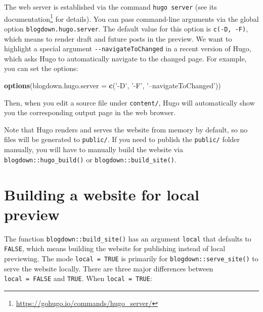 \documentclass[12pt,]{krantz}
\makeatletter
\newenvironment{Shaded}{\begin{snugshade}}{\end{snugshade}}
\newcommand{\KeywordTok}[1]{\textcolor[rgb]{0.13,0.29,0.53}{\textbf{#1}}}
\newcommand{\DataTypeTok}[1]{\textcolor[rgb]{0.13,0.29,0.53}{#1}}
\newcommand{\StringTok}[1]{\textcolor[rgb]{0.31,0.60,0.02}{#1}}
\newcommand{\NormalTok}[1]{#1}
\renewcommand{\href}[2]{#2\footnote{\url{#1}}}
\newenvironment{kframe}{%
\medskip{}
\setlength{\fboxsep}{.8em}
 \def\at@end@of@kframe{}%
 \ifinner\ifhmode%
  \def\at@end@of@kframe{\end{minipage}}%
  \begin{minipage}{\columnwidth}%
 \fi\fi%
 \def\FrameCommand##1{\hskip\@totalleftmargin \hskip-\fboxsep
 \colorbox{shadecolor}{##1}\hskip-\fboxsep
     \hskip-\linewidth \hskip-\@totalleftmargin \hskip\columnwidth}%
 \MakeFramed {\advance\hsize-\width
   \@totalleftmargin\z@ \linewidth\hsize
   \@setminipage}}%
 {\par\unskip\endMakeFramed%
 \at@end@of@kframe}
\renewenvironment{Shaded}{\begin{kframe}}{\end{kframe}}
\theoremstyle{definition}
\theoremstyle{definition}
\theoremstyle{definition}
\theoremstyle{remark}
\makeatother
\begin{document}
The web server is established via the command \texttt{hugo\ server} (see
\href{https://gohugo.io/commands/hugo_server/}{its documentation} for
details). You can pass command-line arguments via the global option
\texttt{blogdown.hugo.server}. The default value for this option is
\texttt{c(\textquotesingle{}-D\textquotesingle{},\ \textquotesingle{}-F\textquotesingle{})},
which means to render draft and future posts in the preview. We want to
highlight a special argument \texttt{-\/-navigateToChanged} in a recent
version of Hugo, which asks Hugo to automatically navigate to the
changed page. For example, you can set the options:

\begin{Shaded}
\begin{Highlighting}[]
\KeywordTok{options}\NormalTok{(}\DataTypeTok{blogdown.hugo.server =} \KeywordTok{c}\NormalTok{(}\StringTok{'-D'}\NormalTok{, }\StringTok{'-F'}\NormalTok{, }\StringTok{'--navigateToChanged'}\NormalTok{))}
\end{Highlighting}
\end{Shaded}

Then, when you edit a source file under \texttt{content/}, Hugo will
automatically show you the corresponding output page in the web browser.

Note that Hugo renders and serves the website from memory by default, so
no files will be generated to \texttt{public/}. If you need to publish
the \texttt{public/} folder manually, you will have to manually build
the website via \texttt{blogdown::hugo\_build()} or
\texttt{blogdown::build\_site()}.

\section{Building a website for local preview}\label{local-preview}

The function
\texttt{blogdown::build\_site()} has an argument \texttt{local} that
defaults to \texttt{FALSE}, which means building the website for
publishing instead of local previewing. The mode \texttt{local\ =\ TRUE}
is primarily for \texttt{blogdown::serve\_site()} to serve the website
locally. There are three major differences between
\texttt{local\ =\ FALSE} and \texttt{TRUE}. When
\texttt{local\ =\ TRUE}:
\end{document}
